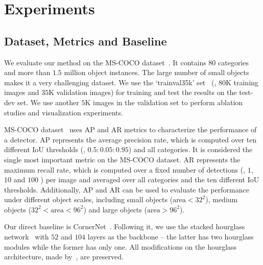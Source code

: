 \documentclass[10pt,twocolumn,letterpaper]{article}
\begin{document}
\section{Experiments}
\label{Experiments}

\subsection{Dataset, Metrics and Baseline}
\label{sec:setting}

We evaluate our method on the MS-COCO dataset~\cite{lin2014microsoft}. It contains $80$ categories and more than $1.5$ million object instances. The large number of small objects makes it a very challenging dataset. We use the `trainval35k' set~\cite{hoiem2012diagnosing} (\ie, $80\mathrm{K}$ training images and $35\mathrm{K}$ validation images) for training and test the results on the test-dev set. We use another $5\mathrm{K}$ images in the validation set to perform ablation studies and visualization experiments.

MS-COCO dataset~\cite{lin2014microsoft} uses AP and AR metrics to characterize the performance of a detector. AP represents the average precision rate, which is computed over ten different IoU thresholds (\ie, $0.5:0.05:0.95$) and all categories. It is considered the single most important metric on the MS-COCO dataset. AR represents the maximum recall rate, which is computed over a fixed number of detections (\ie, $1$, $10$ and $100$ ) per image and averaged over all categories and the ten different IoU thresholds. Additionally, AP and AR can be used to evaluate the performance under different object scales, including small objects ($\mathrm{area}<32^{2}$), medium objects ($32^{2}<\mathrm{area}<96^{2}$) and large objects ($\mathrm{area}>96^{2}$).

Our direct baseline is CornerNet~\cite{law2018cornernet}. Following it, we use the stacked hourglass network~\cite{newell2016stacked} with $52$ and $104$ layers as the backbone -- the latter has two hourglass modules while the former has only one. All modifications on the hourglass architecture, made by~\cite{law2018cornernet}, are preserved.
\end{document}
